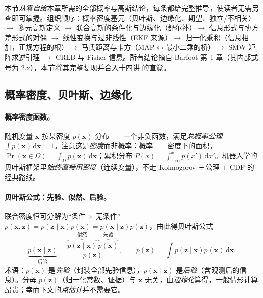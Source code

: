 本节\emph{从零自给}本章所需的全部概率与高斯结论，每条都给完整推导，使读者无需另查即可掌握。组织顺序：概率密度基元（贝叶斯、边缘化、期望、独立/不相关）$\to$ 多元高斯定义 $\to$ 联合高斯的条件化与边缘化（舒尔补）$\to$ 信息形式与协方差形式的对偶 $\to$ 线性变换与过非线性（EKF 来源）$\to$ 归一化乘积（信息相加，正规方程的根）$\to$ 马氏距离与卡方（MAP$\leftrightarrow$最小二乘的桥）$\to$ SMW 矩阵求逆引理 $\to$ CRLB 与 Fisher 信息。所有结论摘自 Barfoot\cite{barfoot2024state} 第 1 章（其内部式号为 2.x），本节将其完整复现并合入十四讲\cite{gaoxiang2019slam14} 的直觉。

\subsection{概率密度、贝叶斯、边缘化}
\label{sec:est-prob-basics}

\paragraph{概率密度函数。}
随机变量 $\mathbf{x}$ 按某密度 $p(\mathbf{x})$ 分布——一个非负函数，满足\emph{总概率公理} $\int p(\mathbf{x})\,\mathrm{d}\mathbf{x}=1$。注意这是\emph{密度}而非概率：概率 $=$ 密度下的面积，$\Pr(\mathbf{x}\in\Omega)=\int_\Omega p(\mathbf{x})\,\mathrm{d}\mathbf{x}$；累积分布 $P(x)=\int_{-\infty}^{x}p(x')\,\mathrm{d}x'$。机器人学的贝叶斯框架里\emph{始终直接用密度}（连续变量），不走 Kolmogorov 三公理 $+$ CDF 的经典路线\cite{barfoot2024state}。

\paragraph{贝叶斯公式：先验、似然、后验。}
联合密度恒可分解为“条件 $\times$ 无条件” $p(\mathbf{x},\mathbf{z})=p(\mathbf{z}\mid\mathbf{x})p(\mathbf{x})=p(\mathbf{x}\mid\mathbf{z})p(\mathbf{z})$，由此得贝叶斯公式\cite{barfoot2024state}
\begin{equation}
  \underbrace{p(\mathbf{x}\mid\mathbf{z})}_{\text{后验}}
  =\frac{\overbrace{p(\mathbf{z}\mid\mathbf{x})}^{\text{似然}}\,\overbrace{p(\mathbf{x})}^{\text{先验}}}{p(\mathbf{z})},
  \qquad p(\mathbf{z})=\int p(\mathbf{z}\mid\mathbf{x})p(\mathbf{x})\,\mathrm{d}\mathbf{x}.
  \label{eq:bayes}
\end{equation}
术语：$p(\mathbf{x})$ 是\emph{先验}（封装全部先验信息），$p(\mathbf{x}\mid\mathbf{z})$ 是\emph{后验}（含观测后的信息）。分母 $p(\mathbf{z})$（归一化常数、证据）与 $\mathbf{x}$ 无关，由\emph{边缘化}算得，一般情形计算昂贵；幸而下文的\emph{点估计}并不需要它。

